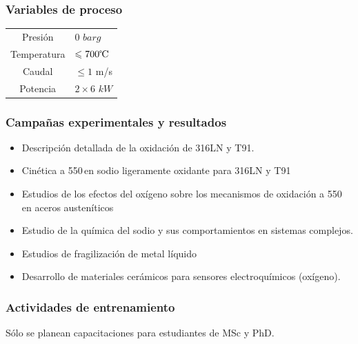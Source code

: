 \documentclass{article}
\begin{document}
\subsubsection*{Variables de proceso}
\begin{table}[H]
\centering
\begin{tabular}{cp{3.5cm}}
\toprule
Presión & 0 $barg$ \\
Temperatura & $\leqslant700\celsius$ \\
Caudal & $\leqslant 1$ m/s \\
Potencia & $2\times6$ $kW$ \\
\bottomrule
\end{tabular}
\end{table}
\subsubsection*{Campañas experimentales y resultados}
\begin{itemize}
    \item Descripción detallada de la oxidación de 316LN y T91.
    \item Cinética a 550\celsius\,en sodio ligeramente oxidante para 316LN y T91
    \item Estudios de los efectos del oxígeno sobre los mecanismos de oxidación a 550\celsius\,en aceros austeníticos
    \item Estudio de la química del sodio y sus comportamientos en sistemas complejos.
    \item Estudios de fragilización de metal líquido
    \item Desarrollo de materiales cerámicos para sensores electroquímicos (oxígeno).
\end{itemize}

\subsubsection*{Actividades de entrenamiento}
Sólo se planean capacitaciones para estudiantes de MSc y PhD.
\newpage
\end{document}
